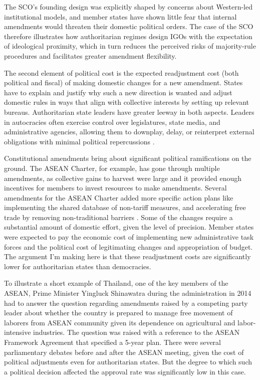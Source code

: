 \documentclass[12pt]{article}
\begin{document}
The SCO's founding design was explicitly shaped by concerns about Western-led institutional models, and member states have shown little fear that internal amendments would threaten their domestic political orders. The case of the SCO therefore illustrates how authoritarian regimes design IGOs with the expectation of ideological proximity, which in turn reduces the perceived risks of majority-rule procedures and facilitates greater amendment flexibility.

The second element of political cost is the expected readjustment cost (both political and fiscal) of making domestic changes for a new amendment. States have to explain and justify why such a new direction is wanted and adjust domestic rules in ways that align with collective interests by setting up relevant bureaus. Authoritarian state leaders have greater leeway in both aspects. Leaders in autocracies often exercise control over legislatures, state media, and administrative agencies, allowing them to downplay, delay, or reinterpret external obligations with minimal political repercussions \parencite{dai_why_2005, weeks_autocratic_2008}.

Constitutional amendments bring about significant political ramifications on the ground. The ASEAN Charter, for example, has gone through multiple amendments, as collective gains to harvest were large and it provided enough incentives for members to invest resources to make amendments. Several amendments for the ASEAN Charter added more specific action plans like implementing the shared database of non-tariff measures, and accelerating free trade by removing non-traditional barriers \parencite{asean2004}. Some of the changes require a substantial amount of domestic effort, given the level of precision. Member states were expected to pay the economic cost of implementing new administrative task forces and the political cost of legitimating changes and appropriation of budget. The argument I'm making here is that these readjustment costs are significantly lower for authoritarian states than democracies.

To illustrate a short example of Thailand, one of the key members of the ASEAN, Prime Minister Yingluck Shinawatra during the administration in 2014 had to answer the question regarding amendments raised by a competing party leader about whether the country is prepared to manage free movement of laborers from ASEAN community given its dependence on agricultural and labor-intensive industries. The question was raised with a reference to the ASEAN Framework Agreement that specified a 5-year plan. There were several parliamentary debates before and after the ASEAN meeting, given the cost of political adjustments even for authoritarian states. But the degree to which such a political decision affected the approval rate was significantly low in this case.
\end{document}
